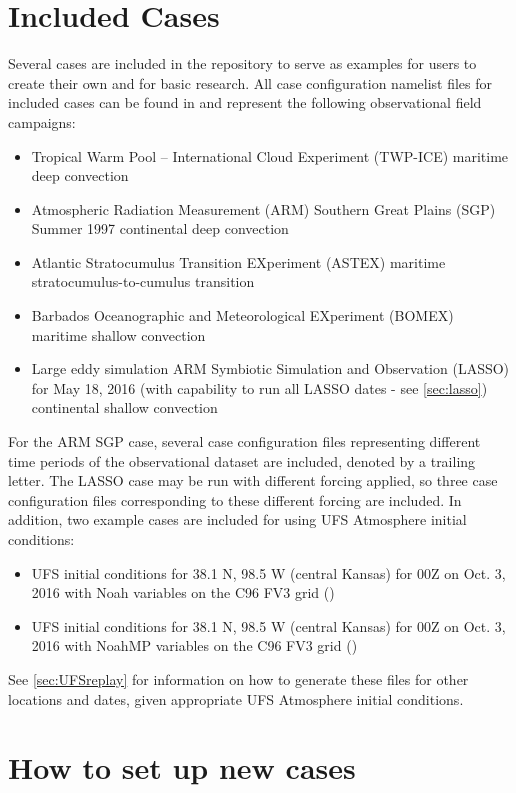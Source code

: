 \section{Included Cases}
Several cases are included in the repository to serve as examples for users to create their own and for basic research. All case configuration namelist files for included cases can be found in  and represent the following observational field campaigns:
\begin{itemize}
\item Tropical Warm Pool -- International Cloud Experiment (TWP-ICE) maritime deep convection
\item Atmospheric Radiation Measurement (ARM) Southern Great Plains (SGP) Summer 1997 continental deep convection
\item Atlantic Stratocumulus Transition EXperiment (ASTEX) maritime stratocumulus-to-cumulus transition
\item Barbados Oceanographic and Meteorological EXperiment (BOMEX) maritime shallow convection
\item Large eddy simulation ARM Symbiotic Simulation and Observation (LASSO) for May 18, 2016 (with capability to run all LASSO dates - see \ref{sec:lasso}) continental shallow convection
\end{itemize}
For the ARM SGP case, several case configuration files representing different time periods of the observational dataset are included, denoted by a trailing letter. The LASSO case may be run with different forcing applied, so three case configuration files corresponding to these different forcing are included. In addition, two example cases are included for using UFS Atmosphere initial conditions:
\begin{itemize}
\item UFS initial conditions for 38.1 N, 98.5 W (central Kansas) for 00Z on Oct. 3, 2016 with Noah variables on the C96 FV3 grid ()
\item UFS initial conditions for 38.1 N, 98.5 W (central Kansas) for 00Z on Oct. 3, 2016 with NoahMP variables on the C96 FV3 grid ()
\end{itemize}
See \ref{sec:UFSreplay} for information on how to generate these files for other locations and dates, given appropriate UFS Atmosphere initial conditions.

\section{How to set up new cases}

